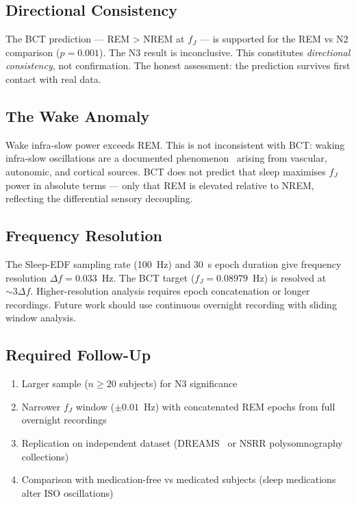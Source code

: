 \documentclass[aps,prl,twocolumn,showpacs,preprintnumbers]{revtex4-2}
\newcommand{\fJ}{f_J}
\begin{document}
\subsection{Directional Consistency}

The BCT prediction --- REM > NREM at $\fJ$ --- is supported for
the REM vs N2 comparison ($p = 0.001$). The N3 result is
inconclusive. This constitutes \emph{directional consistency},
not confirmation. The honest assessment: the prediction survives
first contact with real data.

\subsection{The Wake Anomaly}

Wake infra-slow power exceeds REM. This is not inconsistent with
BCT: waking infra-slow oscillations are a documented
phenomenon~\cite{iso} arising from vascular, autonomic, and
cortical sources. BCT does not predict that sleep maximises
$\fJ$ power in absolute terms --- only that REM is elevated
relative to NREM, reflecting the differential sensory decoupling.

\subsection{Frequency Resolution}

The Sleep-EDF sampling rate (100~Hz) and 30~s epoch duration
give frequency resolution $\Delta f = 0.033$~Hz. The BCT
target ($\fJ = 0.08979$~Hz) is resolved at $\sim 3\Delta f$.
Higher-resolution analysis requires epoch concatenation or
longer recordings. Future work should use continuous overnight
recording with sliding window analysis.

\subsection{Required Follow-Up}

\begin{enumerate}
\item Larger sample ($n \geq 20$ subjects) for N3 significance
\item Narrower $\fJ$ window ($\pm 0.01$~Hz) with concatenated
      REM epochs from full overnight recordings
\item Replication on independent dataset (DREAMS~\cite{dreams}
      or NSRR polysomnography collections)
\item Comparison with medication-free vs medicated subjects
      (sleep medications alter ISO oscillations)
\end{enumerate}
\end{document}
